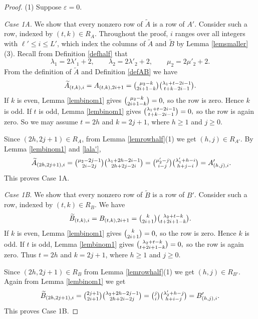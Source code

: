 \documentclass[11pt]{amsart}
\theoremstyle{remark}
\theoremstyle{definition}
\newcommand{\la}{\lambda}
\numberwithin{equation}{section}
\begin{document}
\begin{proof}
	(1) Suppose $\varepsilon=0$. 
	
	\textit{Case 1A}. We show that every nonzero row of
	$\widetilde A$ is a row of $A'$.
	Consider such a row, indexed by $(t,k)\in R_A$.
	Throughout the proof, $i$ ranges over all integers with
	$\ell'\le i\le L'$, which index the columns of $\widetilde A$
	and $\widetilde B$ by Lemma \ref{lemsmaller}(3).
	Recall from Definition \ref{defhalf} that
	\begin{equation}\label{lala'}
	\la_1=2\la'_1+2,\qquad
	\la_2=2\la'_2+2,\qquad
	\mu_2=2\mu'_2+2.
	\end{equation}
	From the definition of $\widetilde A$ and Definition \ref{defAB} we have
	\[
	\widetilde A_{(t,k),i}
	=A_{(t,k),2i+1}
	=\tbinom{\mu_2-k}{2i+1-k}
	\tbinom{\la_1+t-2i-1}{t+k-2i-1}.
	\]
	If $k$ is even, Lemma \ref{lembinom1} gives
$
	\tbinom{\mu_2-k}{2i+1-k}=0,
$
	so the row is zero. Hence $k$ is odd.
	If $t$ is odd, Lemma \ref{lembinom1} gives
$
	\tbinom{\la_1+t-2i-1}{t+k-2i-1}=0,
$
	so the row is again zero. So we may assume $t=2h$ and $k=2j+1$, where
	 $h\ge1$ and $j\ge0$.
	
	Since $(2h,2j+1)\in R_A$, from 
	Lemma \ref{lemrowhalf}(1) we get $(h,j)\in R_{A'}$.
	By Lemma \ref{lembinom1} and \eqref{lala'},
	\begin{equation}\label{rowAepsilonzero}
		\
			\widetilde A_{(2h,2j+1),i}
			=\tbinom{\mu_2-2j-1}{2i-2j}
			\tbinom{\la_1+2h-2i-1}{2h+2j-2i}=\tbinom{\mu'_2-j}{i-j}
			\tbinom{\la'_1+h-i}{h+j-i}
			=A'_{(h,j),i}.	\end{equation}
	This proves Case 1A.
	
	\textit{Case 1B}. We show that every nonzero row of
	$\widetilde B$ is a row of $B'$.
	Consider such a row, indexed by $(t,k)\in R_B$. We have
	\[
	\widetilde B_{(t,k),i}
	=B_{(t,k),2i+1}
	=\tbinom{k}{2i+1}
	\tbinom{\la_2+t-k}{t+2i+1-k}.
	\]
	If $k$ is even, Lemma \ref{lembinom1} gives
$
	\tbinom{k}{2i+1}=0,
$
	so the row is zero. Hence $k$ is odd.
	If $t$ is odd, Lemma \ref{lembinom1} gives
$
	\tbinom{\la_2+t-k}{t+2i+1-k}=0,
	$
	so the row is again zero. Thus $t=2h$ and $k=2j+1$, where $h\ge1$ and $j\ge0$.
	
	Since $(2h,2j+1)\in R_B$ from
	Lemma \ref{lemrowhalf}(1) we get $(h,j)\in R_{B'}$.
	Again from Lemma \ref{lembinom1} we get
	\begin{equation}\label{rowBepsilonzero}
			\widetilde B_{(2h,2j+1),i}
			=\tbinom{2j+1}{2i+1}
			\tbinom{\la_2+2h-2j-1}{2h+2i-2j}=\tbinom ji\tbinom{\la'_2+h-j}{h+i-j}
			=B'_{(h,j),i}.
	\end{equation}
	This proves Case 1B.
	

\end{proof}
\end{document}
